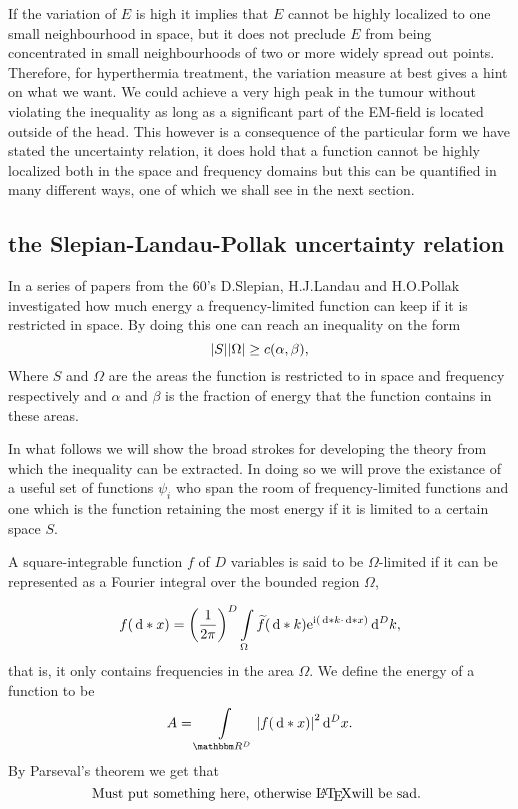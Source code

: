 \documentclass[11pt,a4paper, 
english, swedish %
]{article}
\begin{document}
If the variation of $E$ is high it implies that $E$ cannot be highly localized to one small neighbourhood in space, but it does not preclude $E$ from being concentrated in small neighbourhoods of two or more widely spread out points. Therefore, for hyperthermia treatment, the variation measure at best gives a hint on what we want. We could achieve a very high peak in the tumour without violating the inequality as long as a significant part of the EM-field is located outside of the head.
This however is a consequence of the particular form we have stated the uncertainty relation, it does hold that a function cannot be highly localized both in the space and frequency domains but this can be quantified in many different ways, one of which we shall see in the next section.

\subsection{the Slepian-Landau-Pollak uncertainty relation}
In a series of papers from the 60's D.Slepian, H.J.Landau and H.O.Pollak investigated how much energy a frequency-limited function can keep if it is restricted in space. By doing this one can reach an inequality on the form
\begin{equation}
\abs{S}\abs{\Omega} \geq c(\alpha,\beta),
\end{equation}
Where $S$ and $\Omega$ are the areas the function is restricted to in space and frequency respectively and $\alpha$ and $\beta$ is the fraction of energy that the function contains in these areas. 

In what follows we will show the broad strokes for developing the theory from which the inequality can be extracted. In doing so we will prove the existance of a useful set of functions ${\psi_i}$ who span the room of frequency-limited functions and one which is the function retaining the most energy if it is limited to a certain space $S$.

A square-integrable function $f$ of $D$ variables is said to be $\Omega$-limited if it can be represented as a Fourier integral over the bounded region $\Omega$,

\begin{equation}
  f(\id*x)=\qty(\frac{1}{2\pi})^D\int_\Omega \widetilde{f}(\id*k)\ee^{\ii(\id*k \cdot \id*x)} \id^Dk,
\end{equation}
that is, it only contains frequencies in the area $\Omega$.
We define the energy of a function to be
\begin{equation*}
A=\int_{\R^D}\abs{f(\id*x)}^2\id^Dx.
\end{equation*}
By Parseval's theorem we get that
\begin{equation*}
\text{Must put something here, otherwise \LaTeX will be sad. }
\end{equation*}






\end{document}
